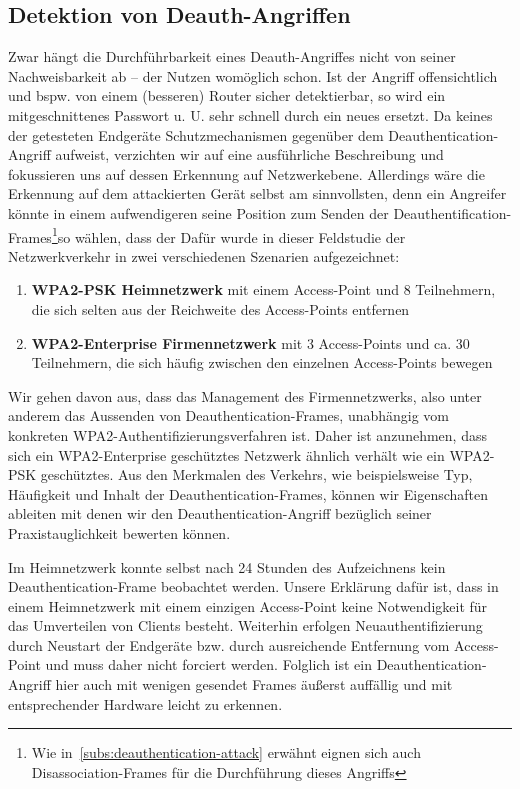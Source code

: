 \subsection{Detektion von Deauth-Angriffen}
Zwar hängt die Durchführbarkeit eines Deauth-Angriffes nicht von seiner Nachweisbarkeit ab -- der Nutzen womöglich schon. Ist der Angriff offensichtlich und bspw. von einem (besseren) Router sicher detektierbar, so wird ein mitgeschnittenes Passwort u. U. sehr schnell durch ein neues ersetzt.
Da keines der getesteten Endgeräte Schutzmechanismen gegenüber dem Deauthentication-Angriff aufweist, verzichten wir auf eine ausführliche Beschreibung und fokussieren uns auf dessen Erkennung auf Netzwerkebene. Allerdings wäre die Erkennung auf dem attackierten Gerät selbst am sinnvollsten, denn ein Angreifer könnte in einem aufwendigeren seine Position zum Senden der Deauthentification-Frames\footnote{Wie in~\ref{subs:deauthentication-attack} erwähnt eignen sich auch Disassociation-Frames für die Durchführung dieses Angriffs}so wählen, dass der 
Dafür wurde in dieser Feldstudie der Netzwerkverkehr in zwei verschiedenen Szenarien aufgezeichnet:
\begin{enumerate}
	\item \textbf{WPA2-PSK Heimnetzwerk} mit einem Access-Point und 8 Teilnehmern, die sich selten aus der Reichweite des Access-Points entfernen
	\item \textbf{WPA2-Enterprise Firmennetzwerk} mit 3 Access-Points und ca. 30 Teilnehmern, die sich häufig zwischen den einzelnen Access-Points bewegen
\end{enumerate}
Wir gehen davon aus, dass das Management des Firmennetzwerks, also unter anderem das Aussenden von Deauthentication-Frames, unabhängig vom konkreten WPA2-Authentifizierungsverfahren ist.
Daher ist anzunehmen, dass sich ein WPA2-Enterprise geschütztes Netzwerk ähnlich verhält wie ein WPA2-PSK geschütztes.
Aus den Merkmalen des Verkehrs, wie beispielsweise Typ, Häufigkeit und Inhalt der Deauthentication-Frames, können wir Eigenschaften ableiten mit denen wir den Deauthentication-Angriff bezüglich seiner Praxistauglichkeit bewerten können.

Im Heimnetzwerk konnte selbst nach 24 Stunden des Aufzeichnens kein Deauthentication-Frame beobachtet werden.
Unsere Erklärung dafür ist, dass in einem Heimnetzwerk mit einem einzigen Access-Point keine Notwendigkeit für das Umverteilen von Clients besteht.
Weiterhin erfolgen Neuauthentifizierung durch Neustart der Endgeräte bzw. durch ausreichende Entfernung vom Access-Point und muss daher nicht forciert werden.
Folglich ist ein Deauthentication-Angriff hier auch mit wenigen gesendet Frames äußerst auffällig und mit entsprechender Hardware leicht zu erkennen.

